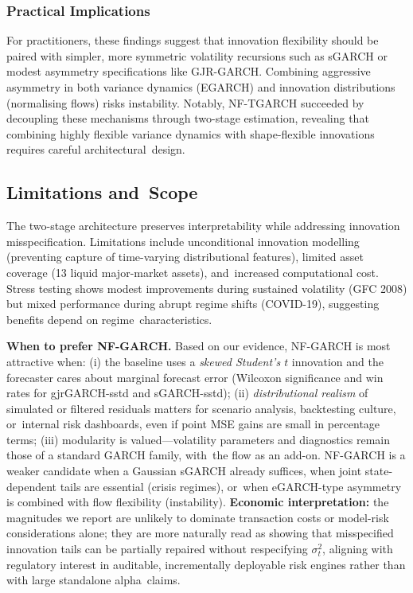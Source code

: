 \documentclass[risks,article,accept,pdftex,moreauthors]{Definitions/mdpi}
\begin{document}
\subsubsection{{Practical Implications}}
For practitioners, these findings suggest that innovation flexibility should be paired with simpler, more symmetric volatility recursions such as sGARCH or modest asymmetry specifications like GJR-GARCH. Combining aggressive asymmetry in both variance dynamics (EGARCH) and innovation distributions (normalising flows) risks instability. Notably, NF-TGARCH succeeded by decoupling these mechanisms through two-stage estimation, revealing that combining highly flexible variance dynamics with shape-flexible innovations requires careful architectural~design.

\subsection{Limitations and~Scope}
The two-stage architecture preserves interpretability while addressing innovation misspecification. Limitations include unconditional innovation modelling (preventing capture of time-varying distributional features), limited asset coverage (13 liquid major-market assets), and~increased computational cost. Stress testing shows modest improvements during sustained volatility (GFC 2008) but mixed performance during abrupt regime shifts (COVID-19), suggesting benefits depend on regime~characteristics.

\textbf{When to prefer NF-GARCH.} Based on our evidence, NF-GARCH is most attractive when: (i) the baseline uses a \emph{skewed Student's $t$} innovation and the forecaster cares about marginal forecast error (Wilcoxon significance and win rates for gjrGARCH-sstd and sGARCH-sstd); (ii) \emph{distributional realism} of simulated or filtered residuals matters for scenario analysis, backtesting culture, or~internal risk dashboards, even if point MSE gains are small in percentage terms; (iii) modularity is valued---volatility parameters and diagnostics remain those of a standard GARCH family, with~the flow as an add-on. NF-GARCH is a weaker candidate when a Gaussian sGARCH already suffices, when joint state-dependent tails are essential (crisis regimes), or~when eGARCH-type asymmetry is combined with flow flexibility (instability). \textbf{Economic interpretation:} the magnitudes we report are unlikely to dominate transaction costs or model-risk considerations alone; they are more naturally read as showing that misspecified innovation tails can be partially repaired without respecifying $\sigma_t^2$, aligning with regulatory interest in auditable, incrementally deployable risk engines rather than with large standalone alpha~claims.
\end{document}
